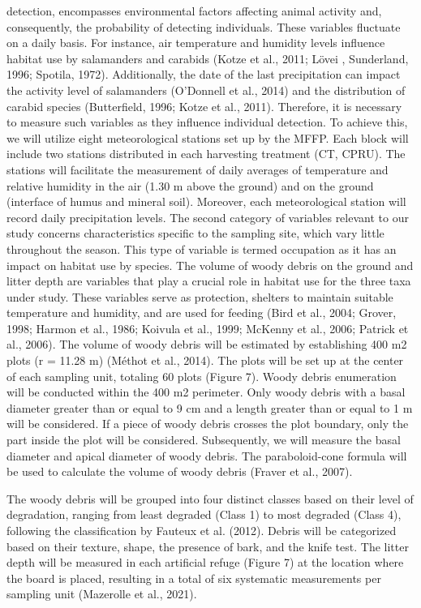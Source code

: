 detection, encompasses environmental factors affecting animal activity and, consequently, the probability of detecting individuals. 
These variables fluctuate on a daily basis. For instance, air temperature and humidity levels influence habitat use by salamanders and carabids (Kotze et al., 2011; Lövei , Sunderland, 1996; Spotila, 1972). 
Additionally, the date of the last precipitation can impact the activity level of salamanders (O’Donnell et al., 2014) and the distribution of carabid species (Butterfield, 1996; Kotze et al., 2011). 
Therefore, it is necessary to measure such variables as they influence individual detection. To achieve this, we will utilize eight meteorological stations set up by the MFFP. 
Each block will include two stations distributed in each harvesting treatment (CT, CPRU). 
The stations will facilitate the measurement of daily averages of temperature and relative humidity in the air (1.30 m above the ground) and on the ground (interface of humus and mineral soil). 
Moreover, each meteorological station will record daily precipitation levels.
The second category of variables relevant to our study concerns characteristics specific to the sampling site, which vary little throughout the season. 
This type of variable is termed occupation as it has an impact on habitat use by species. 
The volume of woody debris on the ground and litter depth are variables that play a crucial role in habitat use for the three taxa under study. 
These variables serve as protection, shelters to maintain suitable temperature and humidity, and are used for feeding 
(Bird et al., 2004; Grover, 1998; Harmon et al., 1986; Koivula et al., 1999; McKenny et al., 2006; Patrick et al., 2006). 
The volume of woody debris will be estimated by establishing 400 m2 plots (r = 11.28 m) (Méthot et al., 2014). 
The plots will be set up at the center of each sampling unit, totaling 60 plots (Figure 7). Woody debris enumeration will be conducted within the 400 m2 perimeter. 
Only woody debris with a basal diameter greater than or equal to 9 cm and a length greater than or equal to 1 m will be considered. 
If a piece of woody debris crosses the plot boundary, only the part inside the plot will be considered. Subsequently, we will measure the basal diameter and apical diameter of woody debris. 
The paraboloid-cone formula will be used to calculate the volume of woody debris (Fraver et al., 2007).


The woody debris will be grouped into four distinct classes based on their level of degradation, ranging from least degraded (Class 1) to most degraded (Class 4), following the classification by Fauteux et al. (2012). 
Debris will be categorized based on their texture, shape, the presence of bark, and the knife test. 
The litter depth will be measured in each artificial refuge (Figure 7) at the location where the board is placed, resulting in a total of six systematic measurements per sampling unit (Mazerolle et al., 2021).


